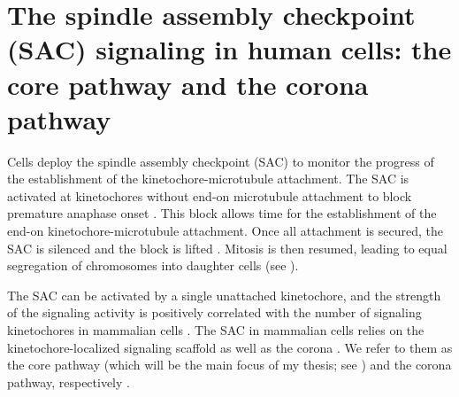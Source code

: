 \section{The spindle assembly checkpoint (SAC) signaling in human cells: the core pathway and the corona pathway}

Cells deploy the spindle assembly checkpoint (SAC) to monitor the progress of the establishment of the kinetochore-microtubule attachment. The SAC is activated at kinetochores without end-on microtubule attachment to block premature anaphase onset \cite{GSK923295MonastrolCotreatment, GSK923295LateralAttachmentEM, LateralAttachmentSAC}. This block allows time for the establishment of the end-on kinetochore-microtubule attachment. Once all attachment is secured, the SAC is silenced and the block is lifted \cite{SACActivationAndSilencing}. Mitosis is then resumed, leading to equal segregation of chromosomes into daughter cells (see ).

The SAC can be activated by a single unattached kinetochore, and the strength of the signaling activity is positively correlated with the number of signaling kinetochores in mammalian cells \cite{RiederNormalProgression, Rheostat, Ablation}. The SAC in mammalian cells relies on the kinetochore-localized signaling scaffold  as well as the corona \cite{GSK923295LateralAttachmentEM, LateralAttachmentSAC, CoronaActivatesSAC}. We refer to them as the core pathway (which will be the main focus of my thesis; see ) and the corona pathway, respectively \cite{100nMNoc, eSAC}.


